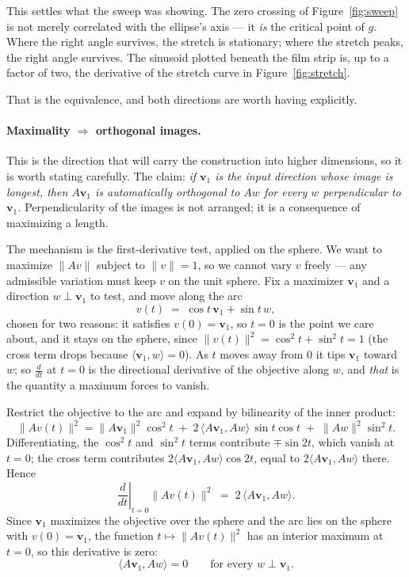 \documentclass[11pt]{article}
\numberwithin{equation}{section}
\newcommand{\ip}[2]{\langle #1, #2 \rangle}
\newcommand{\vv}[1]{\mathbf{v}_{#1}}
\theoremstyle{plainish}
\begin{document}
This settles what the sweep was showing. The zero crossing of
Figure~\ref{fig:sweep} is not merely correlated with the ellipse's axis --- it
\emph{is} the critical point of $g$. Where the right angle survives, the stretch
is stationary; where the stretch peaks, the right angle survives. The sinusoid
plotted beneath the film strip is, up to a factor of two, the derivative of the
stretch curve in Figure~\ref{fig:stretch}.

That is the equivalence, and both directions are worth having explicitly.

\paragraph{Maximality $\Rightarrow$ orthogonal images.} This is the direction
that will carry the construction into higher dimensions, so it is worth stating
carefully. The claim: \emph{if $\vv1$ is the input direction whose image is
longest, then $A\vv1$ is automatically orthogonal to $Aw$ for every $w$
perpendicular to $\vv1$.} Perpendicularity of the images is not arranged; it is
a consequence of maximizing a length.

The mechanism is the first-derivative test, applied on the sphere. We want to
maximize $\|Av\|$ subject to $\|v\| = 1$, so we cannot vary $v$ freely --- any
admissible variation must keep $v$ on the unit sphere. Fix a maximizer $\vv1$
and a direction $w \perp \vv1$ to test, and move along the arc
\begin{equation}v(t) \;=\; \cos t\, \vv1 + \sin t \, w ,
\end{equation}
chosen for two reasons: it satisfies $v(0) = \vv1$, so $t = 0$ is the point we
care about, and it stays on the sphere, since
$\|v(t)\|^2 = \cos^2 t + \sin^2 t = 1$ (the cross term drops because
$\ip{\vv1}{w} = 0$). As $t$ moves away from $0$ it tips $\vv1$ toward $w$; so
$\frac{d}{dt}$ at $t=0$ is the directional derivative of the objective along
$w$, and \emph{that} is the quantity a maximum forces to vanish.

Restrict the objective to the arc and expand by bilinearity of the inner
product:
\begin{equation}\|Av(t)\|^2
= \|A\vv1\|^2\cos^2 t
\;+\; 2\,\ip{A\vv1}{Aw}\,\sin t\cos t
\;+\; \|Aw\|^2 \sin^2 t .
\end{equation}
Differentiating, the $\cos^2 t$ and $\sin^2 t$ terms contribute
$\mp \sin 2t$, which vanish at $t = 0$; the cross term contributes
$2\ip{A\vv1}{Aw}\cos 2t$, equal to $2\ip{A\vv1}{Aw}$ there. Hence
\begin{equation}\left.\frac{d}{dt}\right|_{t=0} \|Av(t)\|^2 \;=\; 2\,\ip{A\vv1}{Aw} .
\end{equation}
Since $\vv1$ maximizes the objective over the sphere and the arc lies on the
sphere with $v(0) = \vv1$, the function $t \mapsto \|Av(t)\|^2$ has an interior
maximum at $t = 0$, so this derivative is zero:
\begin{equation}\ip{A\vv1}{Aw} = 0 \qquad \text{for every } w \perp \vv1 .
\end{equation}
\end{document}
